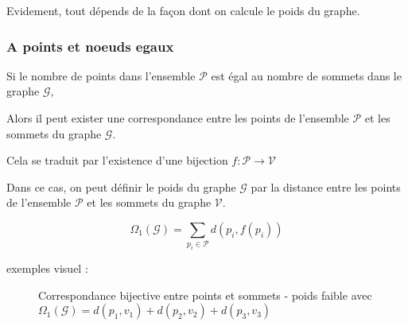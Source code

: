 \documentclass[12pt,a4paper]{article}
\begin{document}
Evidement, tout dépends de la façon dont on calcule le poids du graphe.


\subsubsection{A points et noeuds egaux}

Si le nombre de points dans l'ensemble \( \mathcal{P} \) est égal au nombre de sommets dans le graphe \( \mathcal{G} \),

Alors il peut exister une correspondance entre les points de l'ensemble \( \mathcal{P} \) et les sommets du graphe \( \mathcal{G} \).

Cela se traduit par l'existence d'une bijection \( f : \mathcal{P} \to \mathcal{V} \) 

Dans ce cas, on peut définir le poids du graphe \( \mathcal{G} \) par la distance entre les points de l'ensemble \( \mathcal{P} \) et les sommets du graphe \( \mathcal{V} \).

\begin{equation*}
    \Omega_1(\mathcal{G}) = \sum_{p_i \in \mathcal{P}} d(p_i, f(p_i))
\end{equation*}


exemples visuel :
\begin{figure}[H]
\centering
{}
\caption{Correspondance bijective entre points et sommets - poids faible avec $\Omega_1(\mathcal{G}) = d(p_1,v_1) + d(p_2,v_2) + d(p_3,v_3)$}
\end{figure}
\end{document}
